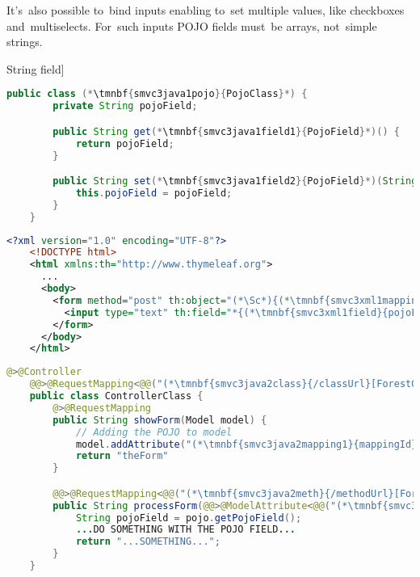 It's~also possible to~bind inputs enabling to~set multiple values, like checkboxes and~multiselects.
For~such inputs POJO fields must~be arrays, not~simple strings.
\newpage

\examplenonl[binding text input to \hyperref[pojo]{POJO} String field]
\enlargethispage{20mm}
\thispagestyle{empty}
\begin{lstlisting}[language=Java, title={POJO class with one String field}]
    public class (*\tmnbf{smvc3java1pojo}{PojoClass}*) {
        private String pojoField;

        public String get(*\tmnbf{smvc3java1field1}{PojoField}*)() {
            return pojoField;
        }

        public String set(*\tmnbf{smvc3java1field2}{PojoField}*)(String pojoField) {
            this.pojoField = pojoField;
        }
    }
\end{lstlisting}
\begin{lstlisting}[language=XML, title={HTML form setting the field}]
    <?xml version="1.0" encoding="UTF-8"?>
    <!DOCTYPE html>
    <html xmlns:th="http://www.thymeleaf.org">
      ...
      <body>
        <form method="post" th:object="(*\Sc*){(*\tmnbf{smvc3xml1mapping}{mappingId}[ForestGreen]*)}" th:action="@{(*\tmnbf{smvc3xml1class}{/classUrl}[ForestGreen]\tmnbf{smvc3xml1meth}{/methodUrl}[ForestGreen]*)}">
          <input type="text" th:field="*{(*\tmnbf{smvc3xml1field}{pojoField}[ForestGreen]*)}">
        </form>
      </body>
    </html>
\end{lstlisting}
\begin{lstlisting}[language=Java, title={Controller displaying and processing the form}]
    @>@Controller
    @@>@RequestMapping<@@("(*\tmnbf{smvc3java2class}{/classUrl}[ForestGreen]*)")
    public class ControllerClass {
        @>@RequestMapping
        public String showForm(Model model) {
            // Adding the POJO to model
            model.addAttribute("(*\tmnbf{smvc3java2mapping1}{mappingId}[ForestGreen]*)", new (*\tmnbf{smvc3java2pojo1}{PojoClass}*)())
            return "theForm"
        }

        @@>@RequestMapping<@@("(*\tmnbf{smvc3java2meth}{/methodUrl}[ForestGreen]*)")
        public String processForm(@@>@ModelAttribute<@@("(*\tmnbf{smvc3java2mapping2}{mappingId}[ForestGreen]*)") (*\tmnbf{smvc3java2pojo2}{PojoClass}*) pojo) {
            String pojoField = pojo.getPojoField();
            ...DO SOMETHING WITH THE POJO FIELD...
            return "...SOMETHING...";
        }
    }
\end{lstlisting}
